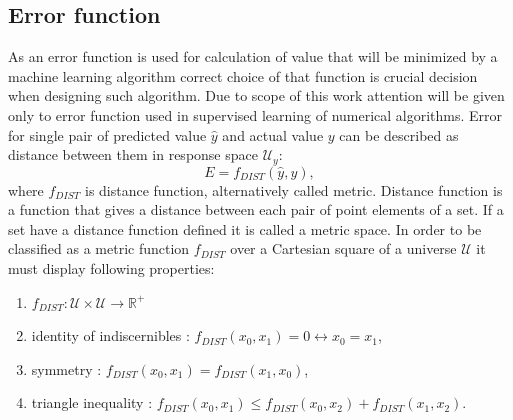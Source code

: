 \subsection{Error function}
\FloatBarrier
As an error function is used for calculation of value that will be minimized by a machine 
learning algorithm correct choice of that function is crucial decision when designing such
algorithm.
Due to scope of this work attention will be given only to error function used in supervised 
learning of numerical algorithms.
Error for single pair of predicted value $\hat{y}$ and actual value $y$ can be described as
distance between them in response space $\mathcal{U}_{y}$:
\begin{equation}
	\label{equ:dist_general}
	E = f_{DIST}(\hat{y},y),
\end{equation}
where $f_{DIST}$ is distance function, alternatively called metric.
Distance function is a function that gives a distance between each pair of point elements of a set.
If a set have a distance function defined it is called a metric space. 
In order to be classified as a metric function $f_{DIST}$ over a Cartesian square of a universe 
$\mathcal{U}$ it must display following properties:
\begin{enumerate}
	\item $f_{DIST} : \mathcal{U} \times \mathcal{U} \to \mathbb{R}^{+}$
	\item identity of indiscernibles : $f_{DIST}(x_{0}, x_{1})=0 \leftrightarrow x_{0} = x_{1}$,
	\item symmetry : $f_{DIST}(x_{0},x_{1})=f_{DIST}(x_{1},x_{0})$,
	\item triangle inequality : $f_{DIST}(x_{0},x_{1}) \leq f_{DIST}(x_{0},x_{2}) +
		f_{DIST}(x_{1},x_{2})$. 
\end{enumerate}

